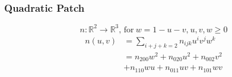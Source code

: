 	\begin{frame}\frametitle{Quadratic Patch}
		\begin{equation*}
			n: \mathbb{R}^2 \rightarrow \mathbb{R}^3 \text{, for}\ w = 1 - u - v \text{,}\ u, v, w \geq 0 
		\end{equation*}
		\begin{equation*}
			\begin{aligned}
			n(u,v) & = \sum\limits_{i+j+k=2} n_{ijk} u^i v^j w^k\\
			& = n_{200} w^2 + n_{020} u^2 + n_{002} v^2\\
			& + n_{110} w u + n_{011} u v + n_{101} w v
			\end{aligned}
		\end{equation*}
	\end{frame}	

